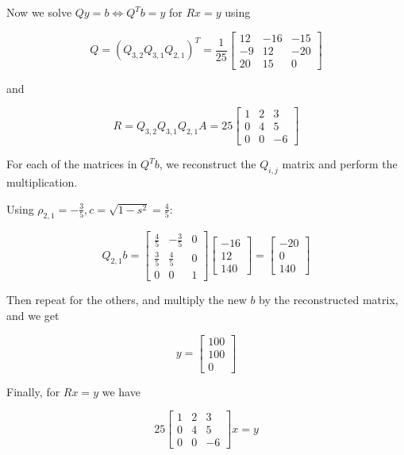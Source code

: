 Now we solve \(Qy = b \iff Q^T b = y\) for \(Rx = y\) using 

\[
    Q = (Q_{3,2}Q_{3,1}Q_{2,1})^T
    = 
    \frac{1}{25}
    \begin{bmatrix}
        12 & -16 & -15 \\ 
        -9 & 12 & -20 \\ 
        20 & 15 & 0
    \end{bmatrix}
\]

and 

\[
    R = Q_{3,2}Q_{3,1}Q_{2,1}A = 25
    \begin{bmatrix}
       1 & 2 & 3 \\ 
       0 & 4 & 5 \\ 
       0 & 0 & -6 
    \end{bmatrix}
\]

For each of the matrices in \(Q^Tb\), we reconstruct the \(Q_{i,j}\) matrix and perform the 
multiplication.

Using \(\rho_{2,1} = -\frac{3}{5}, c = \sqrt{1 - s^2} = \frac{4}{5}\):

\[
    Q_{2,1}b = 
    \begin{bmatrix}
        \frac{4}{5} & - \frac{3}{5} & 0 \\ 
        \frac{3}{5} & \frac{4}{5} & 0 \\ 
        0 & 0 & 1
    \end{bmatrix}
    \begin{bmatrix}
        -16 \\ 
        12 \\ 
        140
    \end{bmatrix}
    = 
    \begin{bmatrix}
        -20 \\ 
        0 \\ 
        140
    \end{bmatrix}
\]

Then repeat for the others, and multiply the new \(b\) by the reconstructed matrix, and we get 

\[
    y = 
    \begin{bmatrix}
        100 \\ 
        100 \\ 
        0
    \end{bmatrix}
\]

Finally, for \(Rx = y\) we have 

\[
    25 
    \begin{bmatrix}
       1 & 2 & 3 \\ 
       0 & 4 & 5 \\ 
       0 & 0 & -6 
    \end{bmatrix}
    x 
    = 
    y
\]

